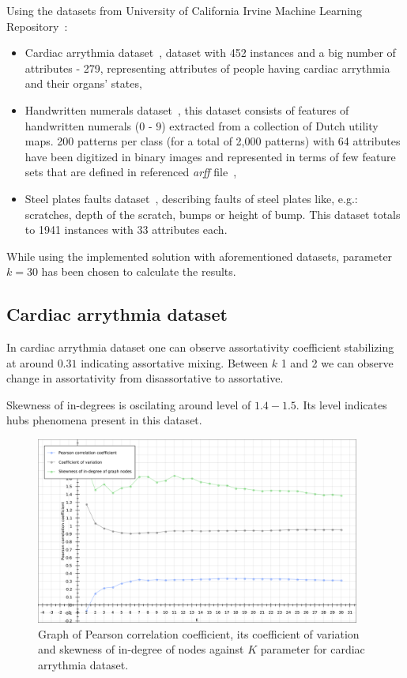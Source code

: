 Using the datasets from University of California Irvine Machine Learning Repository~\cite{uci_datasets}:

\begin{itemize}
\item Cardiac arrythmia dataset~\cite{dataset_cardiac_arythmia}, dataset with 452 instances and a big number of attributes - 279, representing attributes of people having cardiac arrythmia and their organs' states,
\item Handwritten numerals dataset~\cite{dataset_handwritten_numerals}, this dataset consists of features of handwritten numerals ($0$ - $9$) extracted from a collection of Dutch utility maps. 200 patterns per class (for a total of 2,000 patterns) with 64 attributes have been digitized in  binary images and represented in terms of few feature sets that are defined in referenced \emph{arff} file~\cite{dataset_handwritten_numerals},
\item Steel plates faults dataset~\cite{dataset_steel_plates_faults}, describing faults of steel plates like, e.g.: scratches, depth of the scratch, bumps or height of bump. This dataset totals to 1941 instances with 33 attributes each.
\end{itemize}

While using the implemented solution with aforementioned datasets, parameter $k = 30$ has been chosen to calculate the results.

\subsection{Cardiac arrythmia dataset}
\label{subsec:cardiac}
In cardiac arrythmia dataset one can observe assortativity coefficient stabilizing at around $0.31$ indicating assortative mixing.
Between $k$ 1 and 2 we can observe change in assortativity from disassortative to assortative.

Skewness of in-degrees is oscilating around level of $1.4 - 1.5$.
Its level indicates hubs phenomena present in this dataset.

\begin{figure}[h!]
  \centering
  \captionsetup{justification=centering}
    \includegraphics[width=0.95\textwidth]{images/arrythmia_pearson.pdf}
  \caption{Graph of Pearson correlation coefficient, its coefficient of variation and skewness of in-degree of nodes against $K$ parameter for cardiac arrythmia dataset.}
  \label{fig:graph_arrythmia_pearson}
\end{figure}


